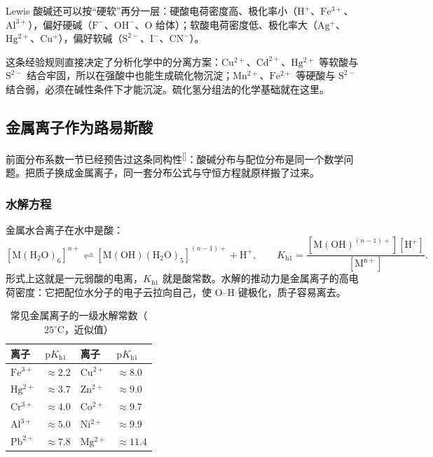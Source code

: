 \documentclass[UTF8]{ctexbook}
\begin{document}
Lewis 酸碱还可以按“硬软”再分一层：硬酸电荷密度高、极化率小（$\mathrm{H^+}$、$\mathrm{Fe^{3+}}$、$\mathrm{Al^{3+}}$），偏好硬碱（$\mathrm{F^-}$、$\mathrm{OH^-}$、$\mathrm{O}$ 给体）；软酸电荷密度低、极化率大（$\mathrm{Ag^+}$、$\mathrm{Hg^{2+}}$、$\mathrm{Cu^+}$），偏好软碱（$\mathrm{S^{2-}}$、$\mathrm{I^-}$、$\mathrm{CN^-}$）。

这条经验规则直接决定了分析化学中的分离方案：$\mathrm{Cu^{2+}}$、$\mathrm{Cd^{2+}}$、$\mathrm{Hg^{2+}}$ 等软酸与 $\mathrm{S^{2-}}$ 结合牢固，所以在强酸中也能生成硫化物沉淀；$\mathrm{Mn^{2+}}$、$\mathrm{Fe^{2+}}$ 等硬酸与 $\mathrm{S^{2-}}$ 结合弱，必须在碱性条件下才能沉淀。硫化氢分组法的化学基础就在这里。

\subsection{金属离子作为路易斯酸}

\label{sec:metal-acid}
前面分布系数一节已经预告过这条同构性\textsuperscript{[\pageref{sec:delta}]}：酸碱分布与配位分布是同一个数学问题。把质子换成金属离子，同一套分布公式与守恒方程就原样搬了过来。

\subsubsection{水解方程}

金属水合离子在水中是酸：
\[
[\mathrm{M(H_2O)_6}]^{n+}\rightleftharpoons[\mathrm{M(OH)(H_2O)_5}]^{(n-1)+}+\mathrm{H^+},
\qquad
K_{\mathrm{h1}}=\frac{[\mathrm{M(OH)}^{(n-1)+}][\mathrm{H^+}]}{[\mathrm{M^{n+}}]}.
\]
形式上这就是一元弱酸的电离，$K_{\mathrm{h1}}$ 就是酸常数。水解的推动力是金属离子的高电荷密度：它把配位水分子的电子云拉向自己，使 O--H 键极化，质子容易离去。

\begin{table}[H]
\centering
\caption{常见金属离子的一级水解常数（$25^\circ\mathrm{C}$，近似值）}
\begin{tabular}{p{2.4cm}p{2.6cm}p{2.4cm}p{2.6cm}}
\toprule
离子 & $\mathrm{p}K_{\mathrm{h1}}$ & 离子 & $\mathrm{p}K_{\mathrm{h1}}$ \\
\midrule
$\mathrm{Fe^{3+}}$ & $\approx2.2$ & $\mathrm{Cu^{2+}}$ & $\approx8.0$ \\
$\mathrm{Hg^{2+}}$ & $\approx3.7$ & $\mathrm{Zn^{2+}}$ & $\approx9.0$ \\
$\mathrm{Cr^{3+}}$ & $\approx4.0$ & $\mathrm{Co^{2+}}$ & $\approx9.7$ \\
$\mathrm{Al^{3+}}$ & $\approx5.0$ & $\mathrm{Ni^{2+}}$ & $\approx9.9$ \\
$\mathrm{Pb^{2+}}$ & $\approx7.8$ & $\mathrm{Mg^{2+}}$ & $\approx11.4$ \\
\bottomrule
\end{tabular}
\end{table}
\end{document}
